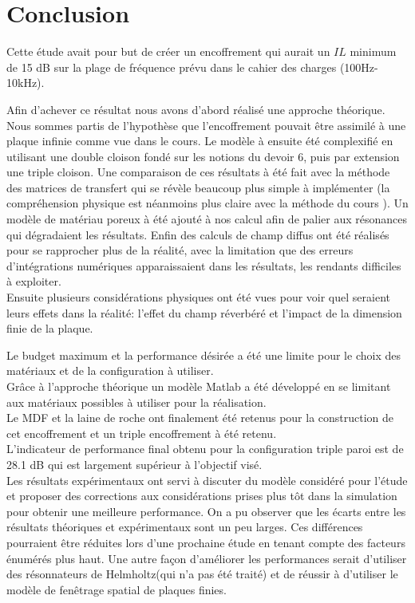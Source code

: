 \documentclass[12pt,foolscap]{report}
\begin{document}
	
	\chapter{Conclusion}
	
	Cette étude avait pour but de créer un encoffrement qui aurait un $IL$ minimum de 15 dB sur la plage de fréquence prévu dans le cahier des charges (100Hz-10kHz).
	
	Afin d'achever ce résultat nous avons d'abord réalisé une approche théorique.\\ Nous sommes partis de l'hypothèse que l'encoffrement pouvait être assimilé à une plaque infinie comme vue dans le cours. Le modèle à ensuite été complexifié en utilisant une double cloison fondé sur les notions du devoir 6, puis par extension une triple cloison. Une comparaison de ces résultats à été fait avec la méthode des matrices de transfert qui se révèle beaucoup plus simple à implémenter (la compréhension physique est néanmoins plus claire avec la méthode du cours ). Un modèle de matériau poreux à été ajouté à nos calcul afin de palier aux résonances qui dégradaient les résultats. Enfin des calculs de champ diffus ont été réalisés pour se rapprocher plus de la réalité, avec la limitation que des erreurs d'intégrations numériques apparaissaient dans les résultats, les rendants difficiles à exploiter.\\
	
	Ensuite plusieurs considérations  physiques ont été vues pour voir quel seraient leurs effets dans la réalité: l'effet du champ réverbéré et l'impact de la dimension finie de la plaque.
	
	Le budget maximum et la performance désirée a été une limite pour le choix des matériaux et de la configuration à utiliser.\\
	Grâce à l'approche théorique un modèle Matlab a été développé en se limitant aux matériaux possibles à utiliser pour la réalisation.\\
	Le MDF et la laine de roche ont finalement été retenus  pour la construction de cet encoffrement et un triple encoffrement à été retenu.\\
	
	L'indicateur de performance final obtenu pour la configuration triple paroi est de 28.1 dB qui est largement supérieur à l'objectif visé.\\
	Les résultats expérimentaux ont servi à discuter du modèle considéré pour l'étude et proposer des corrections aux considérations prises plus tôt dans la simulation pour obtenir une meilleure performance. On a pu observer que les écarts entre les résultats théoriques et expérimentaux sont un peu larges. Ces différences pourraient être réduites lors d'une prochaine étude en tenant compte des facteurs énumérés plus haut. Une autre façon d'améliorer les performances serait d'utiliser des résonnateurs de Helmholtz(qui n'a pas été traité) et de réussir à d'utiliser le modèle de fenêtrage spatial de plaques finies.\\
	
\end{document}
